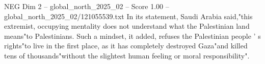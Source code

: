 \begin{textsample}{NEG Dim 2 – global\_north\_2025\_02 – Score 1.00 – global\_north\_2025\_02/121055539.txt}
In its statement, Saudi Arabia said,"this extremist, occupying mentality does not understand what the Palestinian land means"to Palestinians.
Such a mindset, it added, refuses the Palestinian people ' s rights"to live in the first place, as it has completely destroyed Gaza"and killed tens of thousands"without the slightest human feeling or moral responsibility".

\end{textsample}
